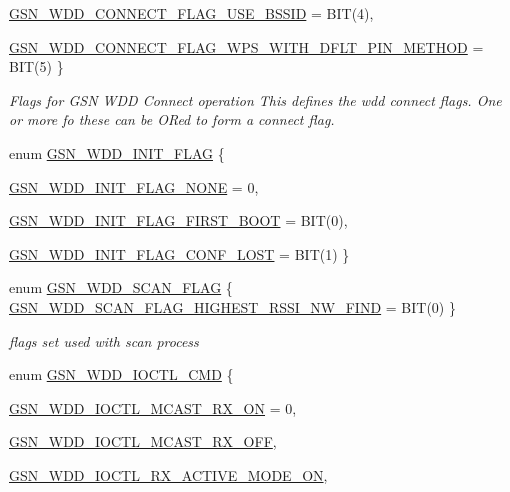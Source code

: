 \begin{DoxyCompactItemize}
\hyperlink{a00677_gga2846a7c5251eb6332e71299cef92d003a98743e2fc7097d6818d140bfc051a921}{GSN\_\-WDD\_\-CONNECT\_\-FLAG\_\-USE\_\-BSSID} =  BIT(4), 
\par
\hyperlink{a00677_gga2846a7c5251eb6332e71299cef92d003abc8bea2329e8acac4ddcd3ea910c7203}{GSN\_\-WDD\_\-CONNECT\_\-FLAG\_\-WPS\_\-WITH\_\-DFLT\_\-PIN\_\-METHOD} =  BIT(5)
 \}
\begin{DoxyCompactList}\small\item\em Flags for GSN WDD Connect operation This defines the wdd connect flags. One or more fo these can be ORed to form a connect flag. \end{DoxyCompactList}\item 
enum \hyperlink{a00603_a4ba2b4079f3dd37aa77afda4013afc79}{GSN\_\-WDD\_\-INIT\_\-FLAG} \{ \par
\hyperlink{a00603_a4ba2b4079f3dd37aa77afda4013afc79abae04da0cfae40f0242a7191fefa98c3}{GSN\_\-WDD\_\-INIT\_\-FLAG\_\-NONE} =  0, 
\par
\hyperlink{a00603_a4ba2b4079f3dd37aa77afda4013afc79ac303b837f61d3ad234d4b358ae5c3ae8}{GSN\_\-WDD\_\-INIT\_\-FLAG\_\-FIRST\_\-BOOT} =  BIT(0), 
\par
\hyperlink{a00603_a4ba2b4079f3dd37aa77afda4013afc79a5d2687a764f011972e1fa19adb2deffa}{GSN\_\-WDD\_\-INIT\_\-FLAG\_\-CONF\_\-LOST} =  BIT(1)
 \}
\item 
enum \hyperlink{a00677_gaa5a68f88cc724016ff0334f21c0dd120}{GSN\_\-WDD\_\-SCAN\_\-FLAG} \{ \hyperlink{a00677_ggaa5a68f88cc724016ff0334f21c0dd120af8eb784f34297ba01c491b4b8e8ac4a4}{GSN\_\-WDD\_\-SCAN\_\-FLAG\_\-HIGHEST\_\-RSSI\_\-NW\_\-FIND} =  BIT(0)
 \}
\begin{DoxyCompactList}\small\item\em flags set used with scan process \end{DoxyCompactList}\item 
enum \hyperlink{a00670_gaf67ac3e77c7a5742b9b0bc7672529533}{GSN\_\-WDD\_\-IOCTL\_\-CMD} \{ \par
\hyperlink{a00670_ggaf67ac3e77c7a5742b9b0bc7672529533a90643fa9ea5beb1e71ac9dc1fc53cec9}{GSN\_\-WDD\_\-IOCTL\_\-MCAST\_\-RX\_\-ON} =  0, 
\par
\hyperlink{a00670_ggaf67ac3e77c7a5742b9b0bc7672529533a05ac24f3b915cf763e622bcbb05b3f4f}{GSN\_\-WDD\_\-IOCTL\_\-MCAST\_\-RX\_\-OFF}, 
\par
\hyperlink{a00670_ggaf67ac3e77c7a5742b9b0bc7672529533a60c5f074f918453013d7c738761add62}{GSN\_\-WDD\_\-IOCTL\_\-RX\_\-ACTIVE\_\-MODE\_\-ON}, 
\par

\end{DoxyCompactItemize}
